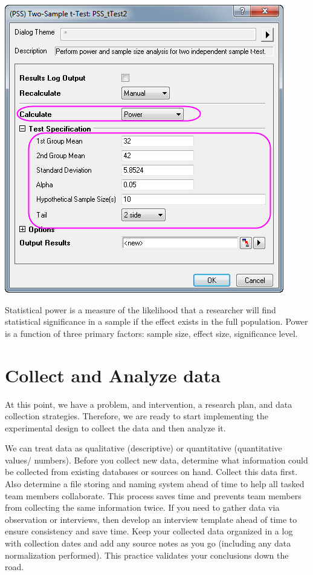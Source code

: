 \documentclass[openany]{book}
\begin{document}
\includegraphics{fig/samplesize.png}

Statistical power is a measure of the likelihood that a researcher will find statistical significance in a sample if the effect exists in the full population. Power is a function of three primary factors: sample size, effect size, significance level.

\hypertarget{collect-and-analyze-data}{%
\section{Collect and Analyze data}\label{collect-and-analyze-data}}

At this point, we have a problem, and intervention, a research plan, and data collection strategies. Therefore, we are ready to start implementing the experimental design to collect the data and then analyze it.

We can treat data as qualitative (descriptive) or quantitative (quantitative values/ numbers). Before you collect new data, determine what information could be collected from existing databases or sources on hand. Collect this data first. Also determine a file storing and naming system ahead of time to help all tasked team members collaborate. This process saves time and prevents team members from collecting the same information twice. If you need to gather data via observation or interviews, then develop an interview template ahead of time to ensure consistency and save time. Keep your collected data organized in a log with collection dates and add any source notes as you go (including any data normalization performed). This practice validates your conclusions down the road.
\end{document}
